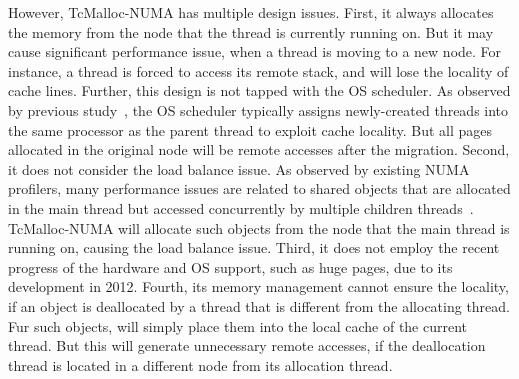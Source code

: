 However, TcMalloc-NUMA has multiple design issues. First, it always allocates the memory from the node that the thread is currently running on. But it may cause significant performance issue, when a thread is moving to a new node. For instance, a thread is forced to access its remote stack, and will lose the locality of cache lines. Further, this design is not tapped with the OS scheduler. As observed by previous study~\cite{Grace}, the OS scheduler typically assigns newly-created threads into the same processor as the parent thread to exploit cache locality. But all pages allocated in the original node will be remote accesses after the migration.  Second, it does not consider the load balance issue. As observed by existing NUMA profilers, many performance issues are related to shared objects that are allocated in the main thread but accessed concurrently by multiple children threads~\cite{XULIU, MemProf}. TcMalloc-NUMA will allocate such objects from the node that the main thread is running on, causing the load balance issue. Third, it does not employ the recent progress of the hardware and OS support, such as huge pages, due to its development in 2012. Fourth, its memory management cannot ensure the locality, if an object is deallocated by a thread that is different from the allocating thread. Fur such objects, \TN{} will simply place them into the local cache of the current thread. But this will generate unnecessary remote accesses, if the deallocation thread is located in a different node from its allocation thread.  


\begin{comment}

It first assumes that a memory block is belong to the same node for its allocating thread. However, this assumption is invalid, and is also contradict with the first-touch policy of the OS. 

If there is no such assumption, we will expect that the OS will provide an efficient API to query the locality of a page. However, no such APIs exist in both Linux and Windows. 

It checks the physical memory usage to determine the future allocations of the same node or the re-use of a remote node. But that is very slow by checking meminfo. 

In the end, it utilizes the mbind to bind the memory to a node specifically. 
	
\end{comment}
	 


